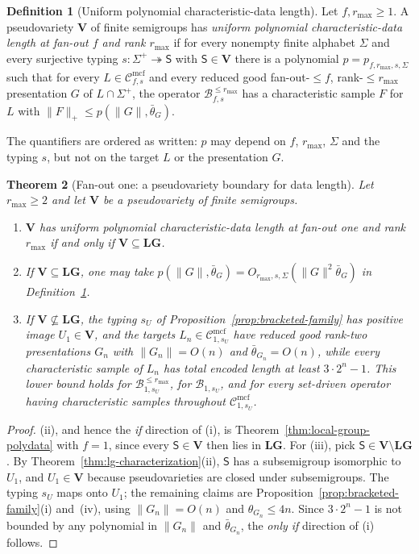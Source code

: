 \documentclass[11pt]{article}
\numberwithin{equation}{section}
\theoremstyle{plain}
\newtheorem{theorem}{Theorem}[section]
\theoremstyle{definition}
\newtheorem{definition}[theorem]{Definition}
\theoremstyle{remark}
\newcommand{\Cmcf}[2]{\mathcal{C}^{\mathrm{mcf}}_{#1,#2}}
\begin{document}
\begin{definition}[Uniform polynomial characteristic-data length]
\label{def:uniform-polydata}
Let $f,r_{\max}\ge1$.  A pseudovariety $\mathbf V$ of finite semigroups
has \emph{uniform polynomial characteristic-data length at fan-out $f$ and
rank $r_{\max}$} if for every nonempty finite alphabet $\Sigma$ and every
surjective typing $s:\Sigma^+\twoheadrightarrow\mathsf S$ with
$\mathsf S\in\mathbf V$ there is a polynomial $p=p_{f,r_{\max},s,\Sigma}$
such that for every $L\in\Cmcf{f}{s}$ and every reduced good
fan-out-$\le f$, rank-$\le r_{\max}$ presentation $G$ of $L\cap\Sigma^+$,
the operator $\mathcal B^{\le r_{\max}}_{f,s}$ has a characteristic sample
$F$ for $L$ with $\|F\|_+\le p(\|G\|,\bar\theta_G)$.
\end{definition}

The quantifiers are ordered as written: $p$ may depend on $f$,
$r_{\max}$, $\Sigma$ and the typing $s$, but not on the target $L$ or the
presentation $G$.

\begin{theorem}[Fan-out one: a pseudovariety boundary for data length]
\label{thm:fanout-one-data}
Let $r_{\max}\ge2$ and let $\mathbf V$ be a pseudovariety of finite
semigroups.
\begin{enumerate}[label=\textup{(\roman*)},leftmargin=*]
\item $\mathbf V$ has uniform polynomial characteristic-data length at
fan-out one and rank $r_{\max}$ if and only if
$\mathbf V\subseteq\mathbf{LG}$.
\item If $\mathbf V\subseteq\mathbf{LG}$, one may take
$p(\|G\|,\bar\theta_G)=O_{r_{\max},s,\Sigma}(\|G\|^2\bar\theta_G)$ in
Definition~\ref{def:uniform-polydata}.
\item If $\mathbf V\not\subseteq\mathbf{LG}$, the typing $s_U$ of
Proposition~\ref{prop:bracketed-family} has positive image
$U_1\in\mathbf V$, and the targets $L_n\in\Cmcf{1}{s_U}$ have reduced good
rank-two presentations $G_n$ with $\|G_n\|=O(n)$ and
$\bar\theta_{G_n}=O(n)$, while every characteristic sample of $L_n$ has
total encoded length at least $3\cdot2^n-1$.  This lower bound holds for
$\mathcal B^{\le r_{\max}}_{1,s_U}$, for $\mathcal B_{1,s_U}$, and for every
set-driven operator having characteristic samples throughout
$\Cmcf{1}{s_U}$.
\end{enumerate}
\end{theorem}

\begin{proof}
(ii), and hence the \emph{if} direction of (i), is
Theorem~\ref{thm:local-group-polydata} with $f=1$, since every
$\mathsf S\in\mathbf V$ then lies in $\mathbf{LG}$.  For (iii), pick
$\mathsf S\in\mathbf V\setminus\mathbf{LG}$.  By
Theorem~\ref{thm:lg-characterization}(ii), $\mathsf S$ has a subsemigroup
isomorphic to $U_1$, and $U_1\in\mathbf V$ because pseudovarieties are
closed under subsemigroups.  The typing $s_U$ maps onto $U_1$; the
remaining claims are Proposition~\ref{prop:bracketed-family}(i) and~(iv),
using $\|G_n\|=O(n)$ and $\theta_{G_n}\le4n$.  Since
$3\cdot2^n-1$ is not bounded by any polynomial in $\|G_n\|$ and
$\bar\theta_{G_n}$, the \emph{only if} direction of (i) follows.
\end{proof}
\end{document}
